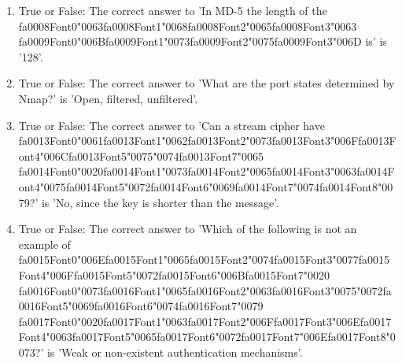 \documentclass[12pt]{article}
\begin{document}
\begin{enumerate}[label=\arabic*.]
\item True or False: The correct answer to 'In MD-5 the length of the {\csname fa0008Font0\endcsname\char"0063}{\csname fa0008Font1\endcsname\char"0068}{\csname fa0008Font2\endcsname\char"0065}{\csname fa0008Font3\endcsname\char"0063} {\csname fa0009Font0\endcsname\char"006B}{\csname fa0009Font1\endcsname\char"0073}{\csname fa0009Font2\endcsname\char"0075}{\csname fa0009Font3\endcsname\char"006D} is' is '128'.
\item True or False: The correct answer to 'What are the port states determined by Nmap?' is 'Open, filtered, unfiltered'.
\item True or False: The correct answer to 'Can a stream cipher have {\csname fa0013Font0\endcsname\char"0061}{\csname fa0013Font1\endcsname\char"0062}{\csname fa0013Font2\endcsname\char"0073}{\csname fa0013Font3\endcsname\char"006F}{\csname fa0013Font4\endcsname\char"006C}{\csname fa0013Font5\endcsname\char"0075}{\char"0074}{\csname fa0013Font7\endcsname\char"0065} {\csname fa0014Font0\endcsname\char"0020}{\csname fa0014Font1\endcsname\char"0073}{\csname fa0014Font2\endcsname\char"0065}{\csname fa0014Font3\endcsname\char"0063}{\csname fa0014Font4\endcsname\char"0075}{\csname fa0014Font5\endcsname\char"0072}{\csname fa0014Font6\endcsname\char"0069}{\csname fa0014Font7\endcsname\char"0074}{\csname fa0014Font8\endcsname\char"0079}?' is 'No, since the key is shorter than the message'.
\item True or False: The correct answer to 'Which of the following is not an example of {\csname fa0015Font0\endcsname\char"006E}{\csname fa0015Font1\endcsname\char"0065}{\csname fa0015Font2\endcsname\char"0074}{\csname fa0015Font3\endcsname\char"0077}{\csname fa0015Font4\endcsname\char"006F}{\csname fa0015Font5\endcsname\char"0072}{\csname fa0015Font6\endcsname\char"006B}{\csname fa0015Font7\endcsname\char"0020} {\csname fa0016Font0\endcsname\char"0073}{\csname fa0016Font1\endcsname\char"0065}{\csname fa0016Font2\endcsname\char"0063}{\csname fa0016Font3\endcsname\char"0075}{\char"0072}{\csname fa0016Font5\endcsname\char"0069}{\csname fa0016Font6\endcsname\char"0074}{\csname fa0016Font7\endcsname\char"0079} {\csname fa0017Font0\endcsname\char"0020}{\csname fa0017Font1\endcsname\char"0063}{\csname fa0017Font2\endcsname\char"006F}{\csname fa0017Font3\endcsname\char"006E}{\csname fa0017Font4\endcsname\char"0063}{\csname fa0017Font5\endcsname\char"0065}{\csname fa0017Font6\endcsname\char"0072}{\csname fa0017Font7\endcsname\char"006E}{\csname fa0017Font8\endcsname\char"0073}?' is 'Weak or non-existent authentication mechanisms'.

\end{enumerate}
\end{document}
